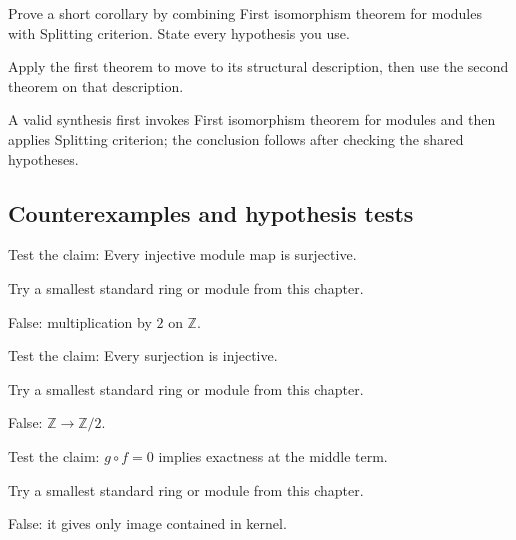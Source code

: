 \begin{exercise}\label{exr:v09-expand-09}
Prove a short corollary by combining First isomorphism theorem for modules with Splitting criterion. State every hypothesis you use.
\end{exercise}
\begin{hint}
Apply the first theorem to move to its structural description, then use the second theorem on that description.
\end{hint}
\begin{solution}
A valid synthesis first invokes First isomorphism theorem for modules and then applies Splitting criterion; the conclusion follows after checking the shared hypotheses.
\end{solution}

\subsection*{Counterexamples and hypothesis tests}

\begin{exercise}\label{exr:v09-expand-10}
Test the claim: Every injective module map is surjective.
\end{exercise}
\begin{hint}
Try a smallest standard ring or module from this chapter.
\end{hint}
\begin{solution}
False: multiplication by $2$ on $\mathbb Z$.
\end{solution}

\begin{exercise}\label{exr:v09-expand-11}
Test the claim: Every surjection is injective.
\end{exercise}
\begin{hint}
Try a smallest standard ring or module from this chapter.
\end{hint}
\begin{solution}
False: $\mathbb Z\to\mathbb Z/2$.
\end{solution}

\begin{exercise}\label{exr:v09-expand-12}
Test the claim: $g\circ f=0$ implies exactness at the middle term.
\end{exercise}
\begin{hint}
Try a smallest standard ring or module from this chapter.
\end{hint}
\begin{solution}
False: it gives only image contained in kernel.
\end{solution}

